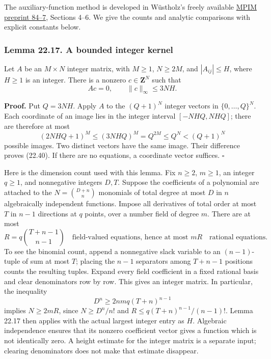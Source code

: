 \documentclass[
  11pt,
  a4paper,
]{article}
\begin{document}
The auxiliary-function method is developed in Wüstholz's freely
available
\href{https://archive.mpim-bonn.mpg.de/id/eprint/3829/1/preprint_1984_7.pdf}{MPIM
preprint 84--7}, Sections 4--6. We give the counts and analytic
comparisons with explicit constants below.

\subsubsection{Lemma 22.17. A bounded integer
kernel}\label{lemma-22.17.-a-bounded-integer-kernel}

Let \(A\) be an \(M\times N\) integer matrix, with \(M\ge1\),
\(N\ge2M\), and \(|A_{ij}|\le H\), where \(H\ge1\) is an integer. There
is a nonzero \(c\in\mathbf Z^N\) such that \[
 Ac=0,\qquad \|c\|_\infty\le3NH.
 \tag{22.40}
\]

\textbf{Proof.} Put \(Q=3NH\). Apply \(A\) to the \((Q+1)^N\) integer
vectors in \(\{0,\ldots,Q\}^N\). Each coordinate of an image lies in the
integer interval \([-NHQ,NHQ]\); there are therefore at most \[
 (2NHQ+1)^M\le(3NHQ)^M=Q^{2M}\le Q^N<(Q+1)^N
\] possible images. Two distinct vectors have the same image. Their
difference proves (22.40). If there are no equations, a coordinate
vector suffices. \(\square\)

Here is the dimension count used with this lemma. Fix \(n\ge2\),
\(m\ge1\), an integer \(q\ge1\), and nonnegative integers \(D,T\).
Suppose the coefficients of a polynomial are attached to the
\(N=\binom{D+n}{n}\) monomials of total degree at most \(D\) in \(n\)
algebraically independent functions. Impose all derivatives of total
order at most \(T\) in \(n-1\) directions at \(q\) points, over a number
field of degree \(m\). There are at most \[
 R=q\binom{T+n-1}{n-1}
 \quad\text{field-valued equations, hence at most }mR
 \quad\text{rational equations}.
 \tag{22.41}
\] To see the binomial count, append a nonnegative slack variable to an
\((n-1)\)-tuple of sum at most \(T\); placing the \(n-1\) separators
among \(T+n-1\) positions counts the resulting tuples. Expand every
field coefficient in a fixed rational basis and clear denominators row
by row. This gives an integer matrix. In particular, the inequality \[
 D^n\ge2nmq(T+n)^{n-1}
 \tag{22.42}
\] implies \(N\ge2mR\), since \(N\ge D^n/n!\) and
\(R\le q(T+n)^{n-1}/(n-1)!\). Lemma 22.17 then applies with the actual
largest integer entry as \(H\). Algebraic independence ensures that its
nonzero coefficient vector gives a function which is not identically
zero. A height estimate for the integer matrix is a separate input;
clearing denominators does not make that estimate disappear.
\end{document}
